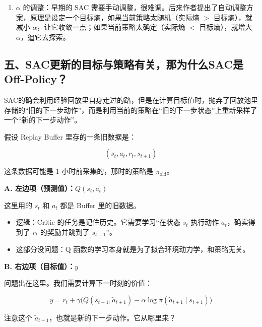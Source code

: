 \begin{enumerate}
\def\labelenumi{\arabic{enumi}.}
\setcounter{enumi}{1}
\tightlist
\item
  \(\alpha\) 的调整：早期的 SAC 需要手动调整，很难调。后来作者提出了自动调整方案，原理是设定一个目标熵，如果当前策略太随机（实际熵 \(>\) 目标熵），就减小 \(\alpha\)，让它收敛一点；如果当前策略太确定（实际熵 \(<\) 目标熵），就增大 \(\alpha\)，逼它去探索。
\end{enumerate}

\hypertarget{ux4e94sacux66f4ux65b0ux7684ux76eeux6807ux4e0eux7b56ux7565ux6709ux5173ux90a3ux4e3aux4ec0ux4e48sacux662foff-policy}{%
\subsection{五、SAC更新的目标与策略有关，那为什么SAC是Off-Policy？}\label{ux4e94sacux66f4ux65b0ux7684ux76eeux6807ux4e0eux7b56ux7565ux6709ux5173ux90a3ux4e3aux4ec0ux4e48sacux662foff-policy}}

SAC的确会利用经验回放里自身走过的路，但是在计算目标值时，抛弃了回放池里存储的``旧的下一步动作''，而是利用当前的策略在``旧的下一步状态''上重新采样了一个``新的下一步动作''。

假设 Replay Buffer 里存的一条旧数据是：

\[
(s_t,a_t,r_t,s_{t+1})
\]

这条数据可能是 1 小时前采集的，那时的策略是 \(\pi_{\mathrm{old}}\)。

\textbf{A. 左边项（预测值）：\(Q(s_t,a_t)\)}

这里用的 \(s_t\) 和 \(a_t\) 都是 Buffer 里的旧数据。

\begin{itemize}
\tightlist
\item
  逻辑：Critic 的任务是记住历史。它需要学习``在状态 \(s_t\) 执行动作 \(a_t\)，确实得到了 \(r_t\) 的奖励并跳到了 \(s_{t+1}\)''。
\item
  这部分没问题：Q 函数的学习本身就是为了拟合环境动力学，和策略无关。
\end{itemize}

\textbf{B. 右边项（目标值）：\(y\)}

问题出在这里。我们需要计算下一时刻的价值：

\[
y
=
r_t
+
\gamma
\bigl(
Q(s_{t+1},\tilde{a}_{t+1})
-
\alpha\log\pi(\tilde{a}_{t+1}\mid s_{t+1})
\bigr)
\]

注意这个 \(\tilde{a}_{t+1}\)，也就是新的下一步动作。它从哪里来？

